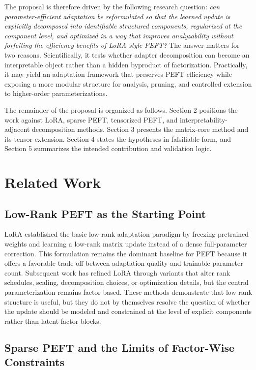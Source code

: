 \documentclass[11pt]{article}
\begin{document}
The proposal is therefore driven by the following research question: \emph{can parameter-efficient adaptation be reformulated so that the learned update is explicitly decomposed into identifiable structured components, regularized at the component level, and optimized in a way that improves analyzability without forfeiting the efficiency benefits of LoRA-style PEFT?} The answer matters for two reasons. Scientifically, it tests whether adapter decomposition can become an interpretable object rather than a hidden byproduct of factorization. Practically, it may yield an adaptation framework that preserves PEFT efficiency while exposing a more modular structure for analysis, pruning, and controlled extension to higher-order parameterizations.

The remainder of the proposal is organized as follows. Section 2 positions the work against LoRA, sparse PEFT, tensorized PEFT, and interpretability-adjacent decomposition methods. Section 3 presents the matrix-core method and its tensor extension. Section 4 states the hypotheses in falsifiable form, and Section 5 summarizes the intended contribution and validation logic.

\section{Related Work}

\subsection{Low-Rank PEFT as the Starting Point}

LoRA established the basic low-rank adaptation paradigm by freezing pretrained weights and learning a low-rank matrix update instead of a dense full-parameter correction. This formulation remains the dominant baseline for PEFT because it offers a favorable trade-off between adaptation quality and trainable parameter count. Subsequent work has refined LoRA through variants that alter rank schedules, scaling, decomposition choices, or optimization details, but the central parameterization remains factor-based. These methods demonstrate that low-rank structure is useful, but they do not by themselves resolve the question of whether the update should be modeled and constrained at the level of explicit components rather than latent factor blocks.

\subsection{Sparse PEFT and the Limits of Factor-Wise Constraints}
\end{document}
